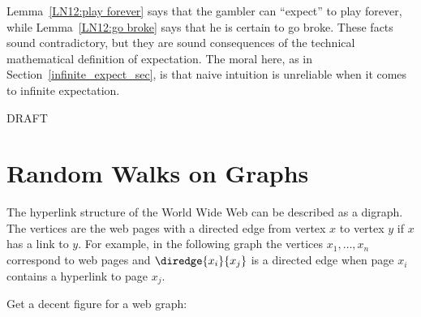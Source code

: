 Lemma~\ref{LN12:play forever} says that the gambler can ``expect'' to
play forever, while Lemma~\ref{LN12:go broke} says that he is certain
to go broke.  These facts sound contradictory, but they are sound
consequences of the technical mathematical definition of expectation.
The moral here, as in Section~\ref{infinite_expect_sec}, is that naive
intuition is unreliable when it comes to infinite expectation.


\begin{problems}
\practiceproblems
{}

\classproblems
{}

\begin{editingnotes}
\homeworkproblems
DRAFT
\end{editingnotes}

\end{problems}


\section{Random Walks on Graphs}\label{Google_sec}

\begin{editingnotes}


\end{editingnotes}

The hyperlink structure of the World Wide Web can be described as a
digraph.  The vertices are the web pages with a directed edge from vertex
$x$ to vertex $y$ if $x$ has a link to $y$.  For example, in the following
graph the vertices $x_1, \ldots, x_n$ correspond to web pages and
$\diredge{x_i}{x_j}$ is a directed edge when page $x_i$ contains a
hyperlink to page $x_j$.

\begin{editingnotes}
Get a decent figure for a web graph:
\end{editingnotes}

